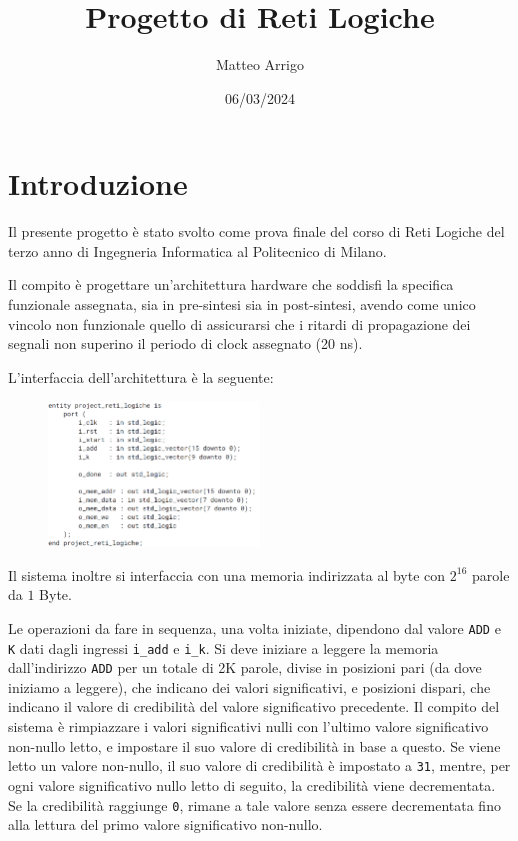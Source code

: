 \documentclass{article}
\title{Progetto di Reti Logiche}
\author{Matteo Arrigo}
\date{06/03/2024} %
\begin{document}
\maketitle

\section{Introduzione}

Il presente progetto è stato svolto come prova finale del corso di Reti Logiche del terzo anno di Ingegneria Informatica al Politecnico di Milano.

Il compito è progettare un’architettura hardware che soddisfi la specifica funzionale assegnata, sia in pre-sintesi sia in post-sintesi, avendo come unico vincolo non funzionale quello di assicurarsi che i ritardi di propagazione dei segnali non superino il periodo di clock assegnato (20 ns).

L’interfaccia dell’architettura è la seguente:

\begin{figure}[h]
    \centering
    \includegraphics[width=0.5\textwidth]{specifica.png} %
    \label{fig:Specifica funzionale - Interfaccia dell'architettura}
\end{figure}

Il sistema inoltre si interfaccia con una memoria indirizzata al byte con $2^{16}$ parole da \(1\) Byte.

Le operazioni da fare in sequenza, una volta iniziate, dipendono dal valore \texttt{ADD} e \texttt{K} dati dagli ingressi \texttt{i\_add} e \texttt{i\_k}. Si deve iniziare a leggere la memoria dall’indirizzo \texttt{ADD} per un totale di 2K parole, divise in posizioni pari (da dove iniziamo a leggere), che indicano dei valori significativi, e posizioni dispari, che indicano il valore di credibilità del valore significativo precedente. Il compito del sistema è rimpiazzare i valori significativi nulli con l’ultimo valore significativo non-nullo letto, e impostare il suo valore di credibilità in base a questo. Se viene letto un valore non-nullo, il suo valore di credibilità è impostato a \texttt{31}, mentre, per ogni valore significativo nullo letto di seguito, la credibilità viene decrementata. Se la credibilità raggiunge \texttt{0}, rimane a tale valore senza essere decrementata fino alla lettura del primo valore significativo non-nullo.
\end{document}
